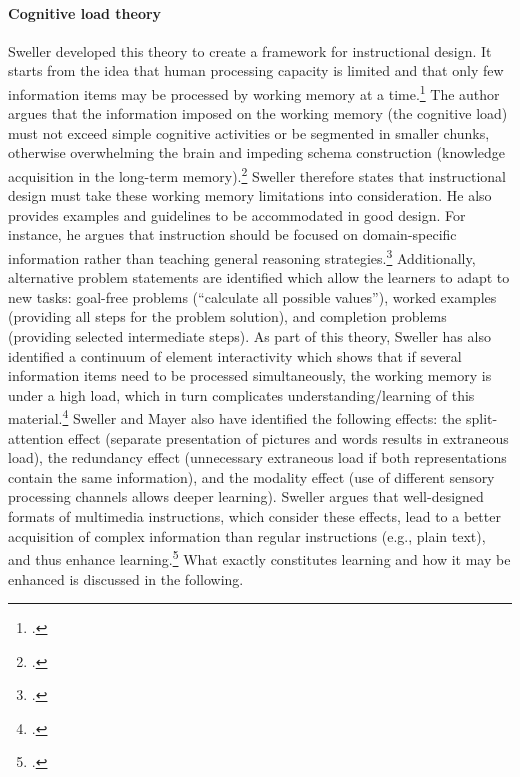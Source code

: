 \paragraph{Cognitive load theory} Sweller developed this theory to create a framework for instructional design. It starts from the idea that human processing capacity is limited and that only few information items may be processed by working memory at a time.\footcites[Cf.][p.250]{SwellerCognitiveArchitectureInstructional1998}[cf.][p.490]{Gervenefficiencymultimedialearning2003} The author argues that the information imposed on the working memory (the cognitive load) must not exceed simple cognitive activities or be segmented in smaller chunks, otherwise overwhelming the brain and impeding schema construction (knowledge acquisition in the long-term memory).\footcites[Cf.][p.255 et seqq]{SwellerCognitiveArchitectureInstructional1998}[cf.][p.2]{SwellerVisualisationInstructionalDesign2002}[cf.][p.562]{Gervenefficiencymultimedialearning2003} Sweller therefore states that instructional design must take these working memory limitations into consideration. He also provides examples and guidelines to be accommodated in good design. For instance, he argues that instruction should be focused on domain-specific information rather than teaching general reasoning strategies.\footcites[Cf.][p.255]{SwellerCognitiveArchitectureInstructional1998}[cf.][p.301]{SwellerCognitiveloadtheory1994} Additionally, alternative problem statements are identified which allow the learners to adapt to new tasks: goal-free problems (\enquote{calculate all possible values}), worked examples (providing all steps for the problem solution), and completion problems (providing selected intermediate steps).
As part of this theory, Sweller has also identified a continuum of element interactivity which shows that if several information items need to be processed simultaneously, the working memory is under a high load, which in turn complicates understanding/learning of this material.\footcites[Cf.][p.261]{SwellerCognitiveArchitectureInstructional1998} Sweller and Mayer also have identified the following effects: the split-attention effect (separate presentation of pictures and words results in extraneous load), the redundancy effect (unnecessary extraneous load if both representations contain the same information), and the modality effect (use of different sensory processing channels allows deeper learning). Sweller argues that well-designed formats of multimedia instructions, which consider these effects, lead to a better acquisition of complex information than regular instructions (e.g., plain text), and thus enhance learning.\footcites[Cf.][p.4]{PaasCognitiveLoadTheory2004} What exactly constitutes learning and how it may be enhanced is discussed in the following.


